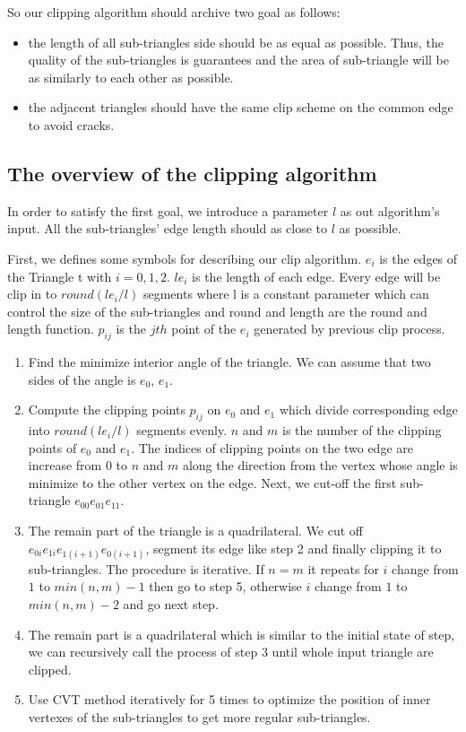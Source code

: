 \documentclass[3p]{elsarticle}
\begin{document}
So our clipping algorithm should archive two goal as follows:
\begin{itemize}
    \item the length of all sub-triangles side should be as equal as possible. Thus, the quality of the sub-triangles is guarantees and the area of sub-triangle will be as similarly to each other as possible.
    \item the adjacent triangles should have the same clip scheme on the common edge to avoid cracks.
\end{itemize}

\subsection{The overview of the clipping algorithm}
In order to satisfy the first goal, we introduce a parameter $l$ as out algorithm's input. All the sub-triangles' edge length should as close to $l$ as possible.

First, we defines some symbols for describing our clip algorithm. $e_i$ is the edges of the Triangle t with $i = 0, 1, 2$. $le_i$ is the length of each edge. Every edge will be clip in to $round(le_i / l)$ segments where l is a constant parameter which can control the size of the sub-triangles and round and length are the round and length function. $p_{ij}$ is the $jth$ point of the $e_i$ generated by previous clip process.
\begin{enumerate}
    \item Find the minimize interior angle of the triangle. We can assume that two sides of the angle is $e_0$, $e_1$.
    \item Compute the clipping points $p_{ij}$ on $e_0$ and $e_1$ which divide corresponding edge into $round(le_i / l)$ segments evenly. $n$ and $m$ is the number of the clipping points of $e_0$ and $e_1$. The indices of clipping points on the two edge are increase from $0$ to $n$ and $m$ along the direction from the vertex whose angle is minimize to the other vertex on the edge. Next, we cut-off the first sub-triangle $e_{00}e_{01}e_{11}$.
    \item The remain part of the triangle is a quadrilateral. We cut off $e_{0i}e_{1i}e_{1(i+1)}e_{0(i+1)}$, segment its edge like step 2 and finally clipping it to sub-triangles. The procedure is iterative. If $n = m$ it repeats for $i$ change from $1$ to $ min(n, m) - 1$ then go to step 5, otherwise $i$ change from $1$ to $min(n, m) - 2$ and go next step.
    \item The remain part is a quadrilateral which is similar to the initial state of step, we can recursively call the process of step 3 until whole input triangle are clipped.
    \item Use CVT method iteratively for 5 times to optimize the position of inner vertexes of the sub-triangles to get more regular sub-triangles.
\end{enumerate}
\end{document}
